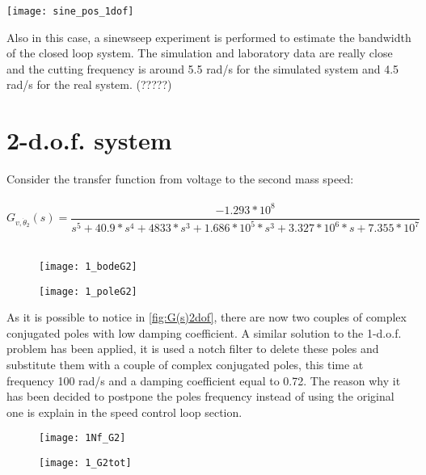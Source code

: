 \begin{figure*}[h]
	\centering
	\texttt{[image: sine\_pos\_1dof]}
	\caption{Sineweep experiment from 0.1 Hz to 1 Hz in 100s}
	\label{fig:sinesweep_pos_1dof}
\end{figure*}

Also in this case, a sinewseep experiment is performed to estimate the bandwidth of the closed loop system. The simulation and laboratory data are really close and the cutting frequency is around 5.5 rad/s for the simulated system and 4.5 rad/s for the real system. (?????)

\newpage

\section{2-d.o.f. system}
Consider the transfer function from voltage to the second mass speed:\\
\\
\[	
G_{v,\dot{\theta}_2}(s)=
\frac{-1.293*10^{8}}{s^5+40.9*s^{4}+4833*s^{3}+1.686*10^{5}*s^{3}+3.327*10^{6}*s+7.355*10^{7}}
\]
\\



\begin{figure*}[h]
	\centering
	\begin{subfigure}{0.4\columnwidth}
		\texttt{[image: 1\_bodeG2]}
	\end{subfigure}
	\begin{subfigure}{0.4\columnwidth}
		\texttt{[image: 1\_poleG2]}
	\end{subfigure}
	\caption{G(s)}
	\label{fig:G(s)2dof}
\end{figure*}

As it is possible to notice in \cref{fig:G(s)2dof}, there are now two couples of complex conjugated poles with low damping coefficient. A similar solution to the 1-d.o.f. problem has been applied, it is used a notch filter to delete these poles and substitute them with a couple of complex conjugated poles, this time at frequency 100 rad/s and a damping coefficient equal to 0.72. The reason why it has been decided to postpone the poles frequency instead of using the original one is explain in the speed control loop section.


\begin{figure*}[h]
	\centering
	\begin{subfigure}{0.35\columnwidth}
		\texttt{[image: 1Nf\_G2]}
	\end{subfigure}
	\begin{subfigure}{0.35\columnwidth}
		\texttt{[image: 1\_G2tot]}
	\end{subfigure}
	\caption{Plant G(s) with Notch Filter Nf(s): $G_{tot}$(s)}
	\label{fig:Plant G(s)with Notch Filter2}
\end{figure*}


